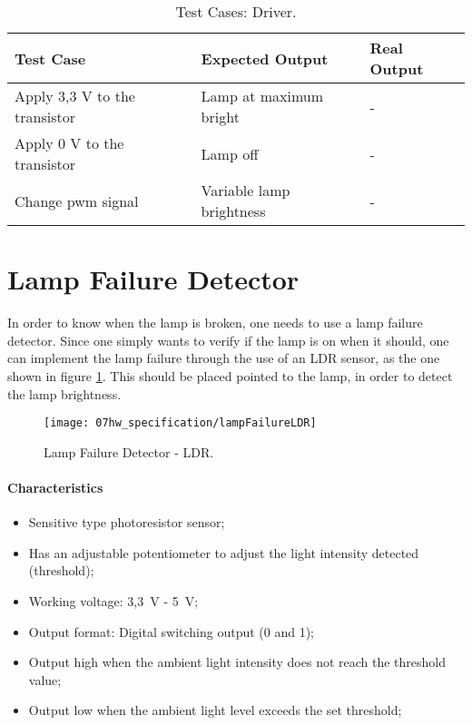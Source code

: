 \begin{table}[H]
	\centering
	\resizebox{\columnwidth}{!}
	{
		\begin{tabular}{|m{3cm}|m{5cm}||m{5cm}|}
			\hline
			\textbf{Test Case} & \textbf{Expected Output} & \textbf{Real Output}
			\\\hline\hline
			Apply 3,3 V to the transistor & Lamp at maximum bright & -
			\\\hline
			Apply 0 V to the transistor & Lamp off & -
			\\\hline
			Change \ac{pwm} signal & Variable lamp brightness & -
			\\\hline
		\end{tabular}
	}
	\caption{Test Cases: Driver.}
	\label{table:test_driver}
\end{table}

\section{Lamp Failure Detector}
In order to know when the lamp is broken, one needs to use a lamp failure detector. Since one simply wants to verify if the lamp is on when it should, one can implement the lamp failure through the use of an LDR sensor, as the one shown in figure \ref{fig:lampFailure}. This should be placed pointed to the lamp, in order to detect the lamp brightness. \cite{lampFailure}

\begin{figure}[H]
	\centering
	\texttt{[image: 07hw\_specification/lampFailureLDR]}
	\caption{Lamp Failure Detector - LDR.}
	\label{fig:lampFailure}
\end{figure}

\paragraph*{Characteristics}
\begin{itemize}
	\item Sensitive type photoresistor sensor;
	\item Has an adjustable potentiometer to adjust the light intensity detected (threshold);
	\item Working voltage: 3,3~V - 5~V; 
	\item Output format: Digital switching output (0 and 1);
	\item Output high when the ambient light intensity does not reach the threshold value;
	\item Output low when the ambient light level exceeds the set threshold; 
\end{itemize}

